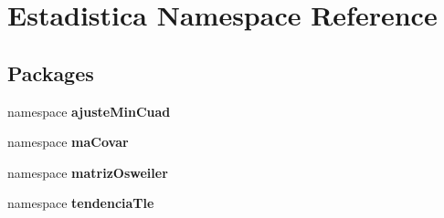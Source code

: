 \section{\-Estadistica \-Namespace \-Reference}
\label{namespace_estadistica}
\subsection*{\-Packages}
\begin{DoxyCompactItemize}
\item 
namespace {\bf ajuste\-Min\-Cuad}
\item 
namespace {\bf ma\-Covar}
\item 
namespace {\bf matriz\-Osweiler}
\item 
namespace {\bf tendencia\-Tle}
\end{DoxyCompactItemize}
